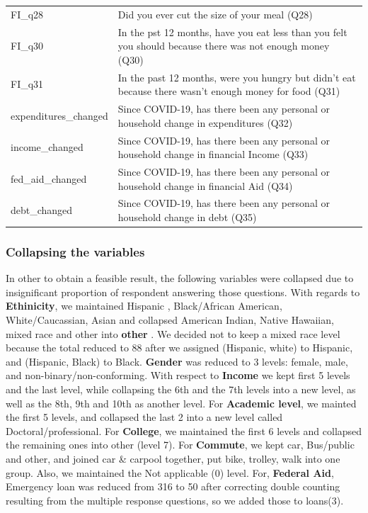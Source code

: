 \documentclass[
  10pt,
]{article}
\begin{document}
\begin{table}[H]
{\begin{tabular}[t]{ll}
FI\_q28 & Did you ever cut the size of your meal (Q28)\\
FI\_q30 & In the pst 12 months, have you eat less than you felt you should because there was not enough money (Q30)\\
FI\_q31 & In the past 12 months, were you hungry but didn't eat because there wasn't enough money for food (Q31)\\
expenditures\_changed & Since COVID-19, has there been any personal or household change in expenditures (Q32)\\
income\_changed & Since COVID-19, has there been any personal or household change in financial Income (Q33)\\
fed\_aid\_changed & Since COVID-19, has there been any personal or household change in financial Aid (Q34)\\
debt\_changed & Since COVID-19, has there been any personal or household change in debt (Q35)\\
\bottomrule
\end{tabular}}
\end{table}

\subsubsection{Collapsing the variables}

In other to obtain a feasible result, the following variables were collapsed due to insignificant proportion of respondent answering those questions. With regards to \textbf{Ethinicity}, we maintained Hispanic , Black/African American, White/Caucassian, Asian and collapsed American Indian, Native Hawaiian, mixed race and other into \textbf{other} . We decided not to keep a mixed race level because the total reduced to 88 after we assigned (Hispanic, white) to Hispanic, and (Hispanic, Black) to Black. \textbf{Gender} was reduced to 3 levels: female, male, and non-binary/non-conforming. With respect to \textbf{Income} we kept first 5 levels and the last level, while collapsing the 6th and the 7th levels into a new level, as well as the 8th, 9th and 10th as another level. For \textbf{Academic level}, we mainted the first 5 levels, and collapsed the last 2 into a new level called Doctoral/professional. For \textbf{College}, we maintained the first 6 levels and collapsed the remaining ones into other (level 7). For \textbf{Commute}, we kept car, Bus/public and other, and joined car \& carpool together, put bike, trolley, walk into one group. Also, we maintained the Not applicable (0) level. For, \textbf{Federal Aid}, Emergency loan was reduced from 316 to 50 after correcting double counting resulting from the multiple response questions, so we added those to loans(3).
\end{document}
